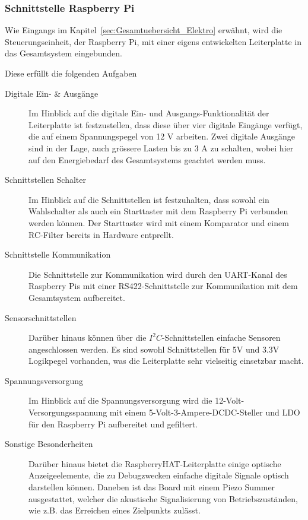\documentclass[main.tex]{subfiles} %
\begin{document}

\subsubsection{Schnittstelle Raspberry Pi}
Wie Eingangs im Kapitel~\ref{sec:Gesamtuebersicht_Elektro} erwähnt, wird die
Steuerungseinheit, der Raspberry Pi, mit einer eigens entwickelten Leiterplatte
in das Gesamtsystem eingebunden.

Diese erfüllt die folgenden Aufgaben

\begin{description}
      \item[Digitale Ein- \& Ausgänge] Im Hinblick auf die digitale Ein- und
            Ausgangs-Funktionalität der Leiterplatte ist festzustellen, dass diese über
            vier digitale Eingänge verfügt, die auf einem Spannungspegel von 12 V arbeiten.
            Zwei digitale Ausgänge sind in der Lage, auch grössere Lasten bis zu 3 A zu
            schalten, wobei hier auf den Energiebedarf des Gesamtsystems geachtet werden
            muss.
      \item[Schnittstellen Schalter] Im Hinblick auf die Schnittstellen ist festzuhalten,
            dass sowohl ein Wahlschalter als auch ein Starttaster mit dem Raspberry Pi
            verbunden werden können. Der Starttaster wird mit einem Komparator und einem
            RC-Filter bereits in Hardware entprellt.
      \item[Schnittstelle Kommunikation] Die Schnittstelle zur Kommunikation wird durch den
            UART-Kanal des Raspberry Pis mit einer RS422-Schnittstelle zur Kommunikation
            mit dem Gesamtsystem aufbereitet.
      \item[Sensorschnittstellen] Darüber hinaus können über die $I^2C$-Schnittstellen
            einfache Sensoren angeschlossen werden. Es sind sowohl Schnittstellen für 5V
            und 3.3V Logikpegel vorhanden, was die Leiterplatte sehr vielseitig einsetzbar
            macht.
      \item[Spannungsversorgung] Im Hinblick auf die Spannungsversorgung wird die
            12-Volt-Versorgungsspannung mit einem 5-Volt-3-Ampere-DCDC-Steller und LDO für
            den Raspberry Pi aufbereitet und gefiltert.
      \item[Sonstige Besonderheiten] Darüber hinaus bietet die RaspberryHAT-Leiterplatte
            einige optische Anzeigeelemente, die zu Debugzwecken einfache digitale Signale
            optisch darstellen können. Daneben ist das Board mit einem Piezo Summer
            ausgestattet, welcher die akustische Signalisierung von Betriebszuständen, wie
            z.B. das Erreichen eines Zielpunkts zulässt.
\end{description}
\end{document}
